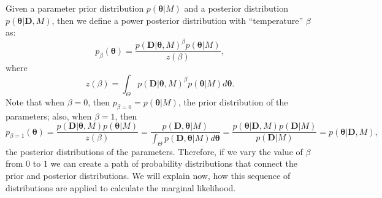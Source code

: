 Given a parameter prior distribution $p ({\bm \theta} | M)$ and a 
posterior distribution $p ({\bm \theta} | {\bm D}, M)$, then we define a
power posterior distribution with ``temperature'' $\beta$ as:
\begin{equation*}
    p_{\beta} ({\bm \theta}) = 
        \frac{p ({\bm D} | {\bm \theta}, M)^\beta p({\bm \theta} | M)}
                              {z (\beta)},
\end{equation*}
where
\begin{equation*}
    z (\beta) = 
        \int_\Theta p ({\bm D} | {\bm \theta}, M)^\beta 
        p({\bm \theta} | M) d{\bm \theta}.
\end{equation*}
Note that when $\beta = 0$, then $p_{\beta=0} = p ({\bm \theta} | M)$, 
the prior distribution of the parameters; also, when $\beta = 1$, then
\begin{equation*}
    p_{\beta=1}({\bm \theta}) = 
        \frac{p ({\bm D} | {\bm \theta}, M) p({\bm \theta} | M)}
             {z (\beta)}
                        =
        \frac{p ({\bm D}, {\bm \theta} | M)}
             {\int_\Theta p ({\bm D}, {\bm \theta} | M)d{\bm \theta}}
                        =
        \frac{p({\bm \theta} | {\bm D}, M) p({\bm D} | M)}
             {p ({\bm D} | M)}
                        =
        p ({\bm \theta} | {\bm D}, M),
\end{equation*}
the posterior distributions of the parameters. Therefore, if we vary the
value of $\beta$ from $0$ to $1$ we can create a path of probability 
distributions that connect the prior and posterior distributions. We
will explain now, how this sequence of distributions are applied to
calculate the marginal likelihood.

